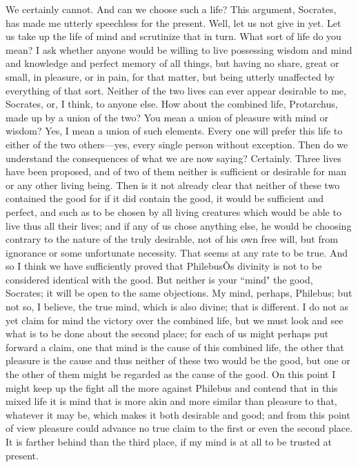 \documentclass[letterpaper,12pt]{article}
\newcommand{\stephpag}[1]{\marginnote{\small\itshape\fontfamily{ppl}\selectfont #1}}
\begin{document}
\begin{drama}
\protarchusspeaks
We certainly cannot.
\socratesspeaks
And can we choose such a life?
\protarchusspeaks
This argument, Socrates, has made me utterly speechless for the present.
\socratesspeaks
Well, let us not give in yet. Let us take up the life of mind and scrutinize that in turn.
\protarchusspeaks
What sort of life do you mean?
\socratesspeaks
I ask whether anyone would be willing to live possessing wisdom and mind and knowledge and perfect memory of all things, \stephpag{e} but having no share, great or small, in pleasure, or in pain, for that matter, but being utterly unaffected by everything of that sort.
\protarchusspeaks
Neither of the two lives can ever appear desirable to me, Socrates, or, I think, to anyone else. \stephpag{22 a}
\socratesspeaks
How about the combined life, Protarchus, made up by a union of the two?
\protarchusspeaks
You mean a union of pleasure with mind or wisdom?
\socratesspeaks
Yes, I mean a union of such elements.
\protarchusspeaks
Every one will prefer this life to either of the two others---yes, every single person without exception.
\socratesspeaks
Then do we understand the consequences of what we are now saying?
\protarchusspeaks
Certainly. Three lives have been proposed, \stephpag{b} and of two of them neither is sufficient or desirable for man or any other living being.
\socratesspeaks
Then is it not already clear that neither of these two contained the good for if it did contain the good, it would be sufficient and perfect, and such as to be chosen by all living creatures which would be able to live thus all their lives; and if any of us chose anything else, he would be choosing contrary to the nature of the truly desirable, not of his own free will, but from ignorance or some unfortunate necessity.
\protarchusspeaks
That seems at any rate to be true. \stephpag{c}
\socratesspeaks
And so I think we have sufficiently proved that PhilebusÕs divinity is not to be considered identical with the good.
\philebusspeaks
But neither is your ``mind" the good, Socrates; it will be open to the same objections.
\socratesspeaks
My mind, perhaps, Philebus; but not so, I believe, the true mind, which is also divine; that is different. I do not as yet claim for mind the victory over the combined life, but we must look and see what is to be done about the second place; \stephpag{d} for each of us might perhaps put forward a claim, one that mind is the cause of this combined life, the other that pleasure is the cause and thus neither of these two would be the good, but one or the other of them might be regarded as the cause of the good. On this point I might keep up the fight all the more against Philebus and contend that in this mixed life it is mind that is more akin and more similar than pleasure to that, whatever it may be, which makes it both desirable and good; and from this point of view \stephpag{e} pleasure could advance no true claim to the first or even the second place. It is farther behind than the third place, if my mind is at all to be trusted at present.

\end{drama}
\end{document}

